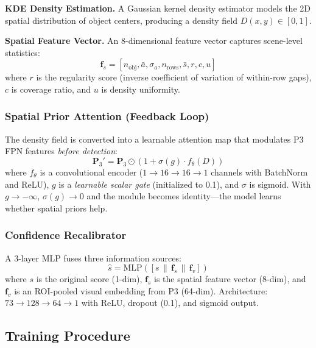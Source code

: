 \documentclass[conference]{IEEEtran}
\begin{document}
\textbf{KDE Density Estimation.} A Gaussian kernel density estimator models the 2D spatial distribution of object centers, producing a density field $D(x, y) \in [0, 1]$.

\textbf{Spatial Feature Vector.} An 8-dimensional feature vector captures scene-level statistics:
\begin{equation}
    \mathbf{f}_s = [n_{\text{obj}}, \bar{a}, \sigma_a, n_{\text{rows}}, \bar{s}, r, c, u]
\end{equation}
where $r$ is the regularity score (inverse coefficient of variation of within-row gaps), $c$ is coverage ratio, and $u$ is density uniformity.

\subsubsection{Spatial Prior Attention (Feedback Loop)}

The density field is converted into a learnable attention map that modulates P3 FPN features \emph{before detection}:
\begin{equation}
    \mathbf{P}_3' = \mathbf{P}_3 \odot \left(1 + \sigma(g) \cdot f_\theta(D)\right)
    \label{eq:spatial_attention}
\end{equation}
where $f_\theta$ is a convolutional encoder ($1 \rightarrow 16 \rightarrow 16 \rightarrow 1$ channels with BatchNorm and ReLU), $g$ is a \emph{learnable scalar gate} (initialized to 0.1), and $\sigma$ is sigmoid. With $g \rightarrow -\infty$, $\sigma(g) \rightarrow 0$ and the module becomes identity---the model learns whether spatial priors help.

\subsubsection{Confidence Recalibrator}

A 3-layer MLP fuses three information sources:
\begin{equation}
    \hat{s} = \text{MLP}\left([s \,\|\, \mathbf{f}_s \,\|\, \mathbf{f}_v]\right)
\end{equation}
where $s$ is the original score (1-dim), $\mathbf{f}_s$ is the spatial feature vector (8-dim), and $\mathbf{f}_v$ is an ROI-pooled visual embedding from P3 (64-dim). Architecture: $73 \rightarrow 128 \rightarrow 64 \rightarrow 1$ with ReLU, dropout (0.1), and sigmoid output.

\subsection{Training Procedure}
\end{document}
